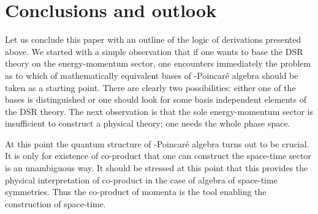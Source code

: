 \documentclass [prd,twocolumn,nofootinbib,showpacs]  {revtex4}
\begin{document}
\section{Conclusions and outlook}

Let us conclude this paper with an outline of the logic of
derivations presented above. We started  with a simple observation
that if one wants to base the DSR theory on the energy-momentum
sector, one encounters immediately the problem as to which of
mathematically equivalent bases of  \myHighlight{$\kappa$}\coordHE{}-Poincar\'e algebra
should be taken as a starting point. There are clearly two
possibilities: either one of the bases is distinguished or one
should look for some basis independent elements of the DSR theory.
The next observation is that  the sole energy-momentum sector is
insufficient to construct a physical theory; one needs the whole
phase space.

At this point the quantum structure of \myHighlight{$\kappa$}\coordHE{}-Poincar\'e algebra
turns out to be crucial.  It is only for existence of co-product
that one can construct the space-time sector is an unambiguous
way. It should be stressed at this point that this provides the
physical interpretation of co-product in the case of algebra of
space-time symmetries. Thus the co-product of momenta is the tool
enabling the construction of space-time.
\end{document}

